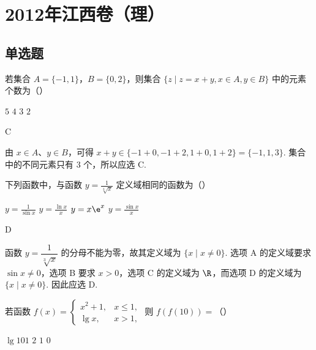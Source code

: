 \chapter{2012年江西卷（理）}

\section{单选题}

\begin{problem}
若集合 \(A = \{-1, 1\}\)，\(B = \{0, 2\}\)，则集合 \(\{z \mid z = x + y, x \in A, y \in B\}\) 中的元素个数为（\quad）

\choices
    {\(5\)}
    {\(4\)}
    {\(3\)}
    {\(2\)}
\end{problem}

\begin{answer}
C
\end{answer}

\begin{solution}
由 \(x\in A\)、\(y\in B\)，可得
\(x+y\in\{-1+0,-1+2,1+0,1+2\}=\{-1,1,3\}\).
集合中的不同元素只有 \(3\) 个，所以应选 C.
\end{solution}

\begin{problem}
下列函数中，与函数 \( y = \frac{1}{\sqrt[3]{x}} \) 定义域相同的函数为（\quad）

\choices
    {\( y = \frac{1}{\sin x} \)}
    {\( y = \frac{\ln x}{x} \)}
    {\( y = x\e^{x} \)}
    {\( y = \frac{\sin x}{x} \)}
\end{problem}

\begin{answer}
D
\end{answer}

\begin{solution}
函数 \(y=\dfrac{1}{\sqrt[3]{x}}\) 的分母不能为零，故其定义域为
\(\{x\mid x\neq0\}\).
选项 A 的定义域要求 \(\sin x\neq0\)，选项 B 要求 \(x>0\)，选项 C 的定义域为 \(\R\)，而选项 D 的定义域为 \(\{x\mid x\neq0\}\). 因此应选 D.
\end{solution}

\begin{problem}
若函数 \( f(x) = \begin{cases}
x^2 + 1, & x \leqslant 1,\\
\lg x, & x > 1,
\end{cases} \) 则 \( f(f(10)) = \)（\quad）

\choices
    {\( \lg 101 \)}
    {\(2\)}
    {\(1\)}
    {\(0\)}
\end{problem}

